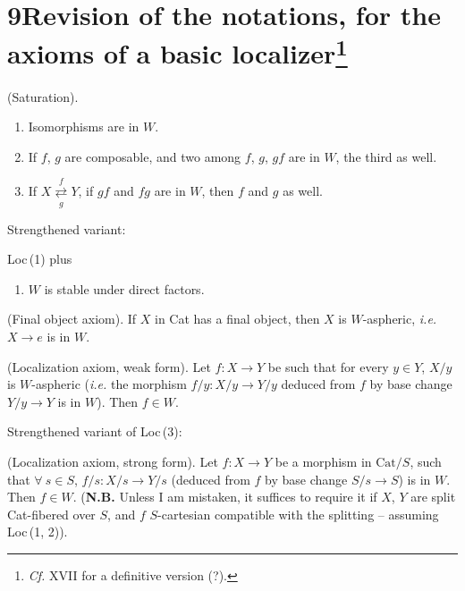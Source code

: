 \documentclass[11pt]{article}
\newcommand{\msp}[1]{\marginpar{\footnotesize [#1]}}
\begin{document}
\msp{page 116}

\section*{9\quad Revision of the notations, for the axioms of a basic localizer\footnote[43]{\textit{Cf.} XVII for a definitive version (?).}}

\begin{description}[style=sameline,leftmargin=6.5em]
\item[Loc\,(1)] (Saturation).
\begin{enumerate}[leftmargin=2.5em]
\item[$a$)] Isomorphisms are in $W$.
\item[$b$)] If $f$, $g$ are composable, and two among $f$, $g$, $gf$ are in $W$, the third as well.
\item[$c$)] If $X \underset{g}{\overset{f}{\rightleftarrows}} Y$, if $gf$ and $fg$ are in $W$, then $f$ and $g$ as well.
\end{enumerate}
\end{description}
\noindent Strengthened variant:
\begin{description}[style=sameline,leftmargin=6.5em]
\item[Loc\,(1\,bis)] Loc\,(1) plus
\begin{enumerate}[leftmargin=2.5em]
\item[$d$)] $W$ is stable under direct factors.
\end{enumerate}
\item[Loc\,(2)] (Final object axiom). If $X$ in Cat has a final object, then $X$ is $W$-aspheric, \textit{i.e.} $X \longrightarrow e$ is in $W$.
\item[Loc\,(3)] (Localization axiom, weak form). Let $f : X \longrightarrow Y$ be such that for every $y \in Y$, $X/y$ is $W$-aspheric (\textit{i.e.} the morphism $f/y : X/y \longrightarrow Y/y$ deduced from $f$ by base change $Y/y \longrightarrow Y$ is in $W$). Then $f \in W$.
\end{description}
\noindent Strengthened variant of Loc\,(3):
\begin{description}[style=sameline,leftmargin=6.5em]
\item[Loc\,(3\,bis)] (Localization axiom, strong form). Let $f : X \longrightarrow Y$ be a morphism in $\mathrm{Cat}/S$, such that $\forall\ s \in S$, $f/s : X/s \longrightarrow Y/s$ (deduced from $f$ by base change $S/s \longrightarrow S$) is in $W$. Then $f \in W$. (\textbf{N.B.} Unless I am mistaken, it suffices to require it if $X$, $Y$ are split Cat-fibered over $S$, and $f$ $S$-cartesian compatible with the splitting – assuming Loc\,(1, 2)). %
\end{description}
\end{document}
